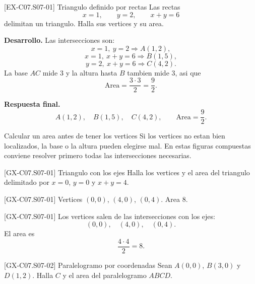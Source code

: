\begin{solvedexample}{[EX-C07.S07-01] Triangulo definido por rectas}
Las rectas
\[
x=1,
\qquad
y=2,
\qquad
x+y=6
\]
delimitan un triangulo. Halla sus vertices y su area.

\textbf{Desarrollo.} Las intersecciones son:
\[
x=1,\ y=2 \Longrightarrow A(1,2),
\]
\[
x=1,\ x+y=6 \Longrightarrow B(1,5),
\]
\[
y=2,\ x+y=6 \Longrightarrow C(4,2).
\]
La base \(AC\) mide \(3\) y la altura hasta \(B\) tambien mide \(3\), asi que
\[
\text{Area}=\frac{3\cdot 3}{2}=\frac{9}{2}.
\]

\begin{center}
\end{center}

\textbf{Respuesta final.}
\[
A(1,2),\quad B(1,5),\quad C(4,2),
\qquad
\text{Area}=\frac{9}{2}.
\]
\end{solvedexample}

\begin{commonerror}{Calcular un area antes de tener los vertices}
Si los vertices no estan bien localizados, la base o la altura pueden elegirse mal. En estas
figuras compuestas conviene resolver primero todas las intersecciones necesarias.
\end{commonerror}

\begin{guidedexercise}{[GX-C07.S07-01] Triangulo con los ejes}
Halla los vertices y el area del triangulo delimitado por \(x=0\), \(y=0\) y \(x+y=4\).
\end{guidedexercise}

\begin{shortanswer}{[GX-C07.S07-01]}
Vertices \((0,0)\), \((4,0)\), \((0,4)\). Area \(8\).
\end{shortanswer}

\begin{fullsolution}{[GX-C07.S07-01]}
Los vertices salen de las intersecciones con los ejes:
\[
(0,0),\quad (4,0),\quad (0,4).
\]
El area es
\[
\frac{4\cdot 4}{2}=8.
\]
\end{fullsolution}

\begin{guidedexercise}{[GX-C07.S07-02] Paralelogramo por coordenadas}
Sean \(A(0,0)\), \(B(3,0)\) y \(D(1,2)\). Halla \(C\) y el area del paralelogramo \(ABCD\).
\end{guidedexercise}

